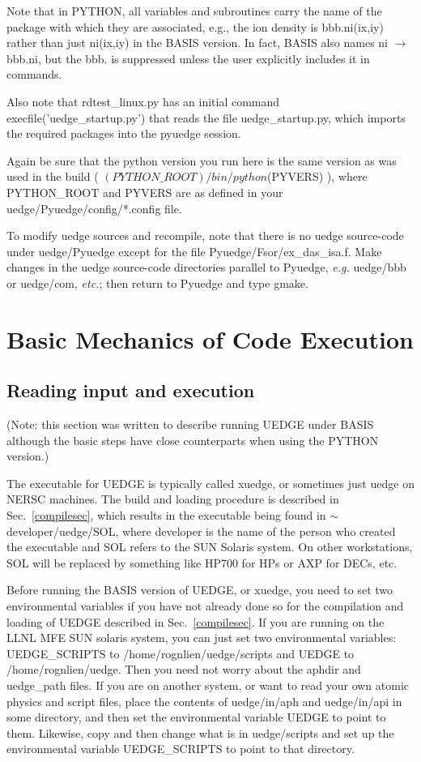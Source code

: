 \documentclass [12pt]{article}
\def\tild{$\sim$}
\begin{document}
Note that in PYTHON, all variables and subroutines carry the name of the
package with which they are associated, e.g., the ion density is bbb.ni(ix,iy)
rather than just ni(ix,iy) in the BASIS version.  In fact, BASIS also names ni
$\rightarrow$ bbb.ni, but the bbb. is suppressed unless the user explicitly
includes it in commands.

Also note that rdtest\_linux.py has an initial command
execfile('uedge\_startup.py') that reads the file uedge\_startup.py, which
imports the required packages into the pyuedge session.

\noindent Again be sure that the python version you run here is the same version as
was used in the build ( $(PYTHON\_ROOT)/bin/python$(PYVERS) ), where 
PYTHON\_ROOT and PYVERS are as defined in your 
uedge/Pyuedge/config/*.config file.

To modify uedge sources and recompile, note that there
is no uedge source-code under uedge/Pyuedge except for the
file Pyuedge/Fsor/ex\_das\_isa.f. Make changes in the uedge source-code
directories parallel to Pyuedge, {\it e.g.} uedge/bbb or uedge/com, {\it etc.}; 
then return to Pyuedge and type gmake.

\section{Basic Mechanics of Code Execution}
\subsection{Reading input and execution}

(Note: this section was written to describe running {\sf UEDGE} under {\sf
BASIS} although the basic steps have close counterparts when using the {\sf
PYTHON} version.)

The executable for {\sf UEDGE} is typically called {\sf xuedge}, or sometimes
just {\sf uedge} on NERSC machines.  The build and loading procedure is
described in Sec.~\ref{compilesec}, which results in the executable being
found in {\sf \tild developer/uedge/SOL}, where developer is the name of the
person who created the executable and SOL refers to the SUN Solaris system.
On other workstations, SOL will be replaced by something like HP700 for HPs or
AXP for DECs, etc.

Before running the {\sf BASIS} version of {\sf UEDGE}, or {\sf xuedge}, you
need to set two environmental variables if you have not already done so for
the compilation and loading of {\sf UEDGE} described in Sec.~\ref{compilesec}.
If you are running on the LLNL MFE SUN solaris system, you can just set two
environmental variables: {\sf UEDGE\_SCRIPTS} to {\sf
/home/rognlien/uedge/scripts} and {\sf UEDGE} to {\sf /home/rognlien/uedge}.
Then you need not worry about the {\sf aphdir} and {\sf uedge\_path} files. If
you are on another system, or want to read your own atomic physics and script
files, place the contents of {\sf uedge/in/aph} and {\sf uedge/in/api} in some
directory, and then set the environmental variable {\sf UEDGE} to point to
them.  Likewise, copy and then change what is in {\sf uedge/scripts} and set
up the environmental variable {\sf UEDGE\_SCRIPTS} to point to that directory.
\end{document}
